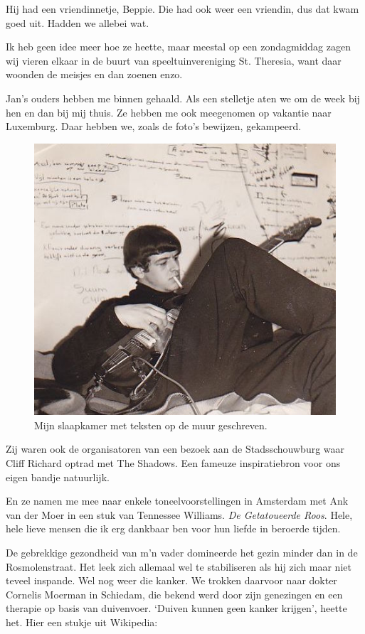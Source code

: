 \documentclass[10pt,twoside, openright]{memoir}
\begin{document}
Hij had een vriendinnetje, Beppie. Die had ook weer een vriendin, dus dat kwam goed uit. Hadden we allebei wat. 

Ik heb geen idee meer hoe ze heette, maar meestal op een zondagmiddag zagen wij vieren elkaar in de buurt van speeltuinvereniging St. Theresia, want daar woonden de meisjes en dan zoenen enzo.

Jan’s ouders hebben me binnen gehaald. Als een stelletje aten we om de week bij hen en dan bij mij thuis. Ze hebben me ook meegenomen op vakantie naar Luxemburg. Daar hebben we, zoals de foto’s bewijzen, gekampeerd. 

\begin{figure}
\includegraphics[width=\textwidth]{img/ch21/gitarist}
\caption*{\footnotesize Mijn slaapkamer met teksten op de muur geschreven.}
\end{figure}

Zij waren ook de organisatoren van een bezoek aan de Stadsschouwburg waar Cliff Richard optrad met The Shadows. Een fameuze inspiratiebron voor ons eigen bandje natuurlijk. 

En ze namen me mee naar enkele toneelvoorstellingen in Amsterdam met Ank van der Moer in een stuk van Tennessee Williams. \emph{De Getatoueerde Roos}. Hele, hele lieve mensen die ik erg dankbaar ben voor hun liefde in beroerde tijden. 

De gebrekkige gezondheid van m’n vader domineerde het gezin minder dan in de Rosmolenstraat. Het leek zich allemaal wel te stabiliseren als hij zich maar niet teveel inspande. Wel nog weer die kanker. We trokken daarvoor naar dokter Cornelis Moerman in Schiedam, die bekend werd door zijn genezingen en een therapie op basis van duivenvoer. `Duiven kunnen geen kanker krijgen', heette het. Hier een stukje uit Wikipedia:
\end{document}
